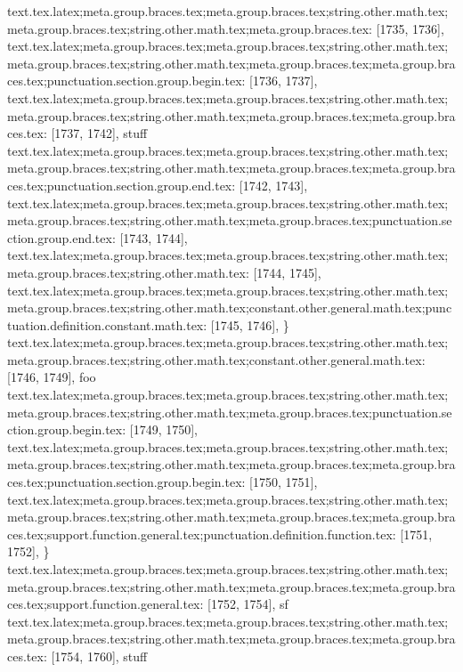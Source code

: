 {{{{{{{{{{{{{{{{{{{{{{{{{{{{{{{{{{{{{{{{{{{{{{text.tex.latex;meta.group.braces.tex;meta.group.braces.tex;string.other.math.tex;meta.group.braces.tex;string.other.math.tex;meta.group.braces.tex: [1735, 1736], { }
text.tex.latex;meta.group.braces.tex;meta.group.braces.tex;string.other.math.tex;meta.group.braces.tex;string.other.math.tex;meta.group.braces.tex;meta.group.braces.tex;punctuation.section.group.begin.tex: [1736, 1737], {{}
text.tex.latex;meta.group.braces.tex;meta.group.braces.tex;string.other.math.tex;meta.group.braces.tex;string.other.math.tex;meta.group.braces.tex;meta.group.braces.tex: [1737, 1742], {stuff}
text.tex.latex;meta.group.braces.tex;meta.group.braces.tex;string.other.math.tex;meta.group.braces.tex;string.other.math.tex;meta.group.braces.tex;meta.group.braces.tex;punctuation.section.group.end.tex: [1742, 1743], {}}
text.tex.latex;meta.group.braces.tex;meta.group.braces.tex;string.other.math.tex;meta.group.braces.tex;string.other.math.tex;meta.group.braces.tex;punctuation.section.group.end.tex: [1743, 1744], {}}
text.tex.latex;meta.group.braces.tex;meta.group.braces.tex;string.other.math.tex;meta.group.braces.tex;string.other.math.tex: [1744, 1745], {
}
text.tex.latex;meta.group.braces.tex;meta.group.braces.tex;string.other.math.tex;meta.group.braces.tex;string.other.math.tex;constant.other.general.math.tex;punctuation.definition.constant.math.tex: [1745, 1746], {\}
text.tex.latex;meta.group.braces.tex;meta.group.braces.tex;string.other.math.tex;meta.group.braces.tex;string.other.math.tex;constant.other.general.math.tex: [1746, 1749], {foo}
text.tex.latex;meta.group.braces.tex;meta.group.braces.tex;string.other.math.tex;meta.group.braces.tex;string.other.math.tex;meta.group.braces.tex;punctuation.section.group.begin.tex: [1749, 1750], {{}
text.tex.latex;meta.group.braces.tex;meta.group.braces.tex;string.other.math.tex;meta.group.braces.tex;string.other.math.tex;meta.group.braces.tex;meta.group.braces.tex;punctuation.section.group.begin.tex: [1750, 1751], {{}
text.tex.latex;meta.group.braces.tex;meta.group.braces.tex;string.other.math.tex;meta.group.braces.tex;string.other.math.tex;meta.group.braces.tex;meta.group.braces.tex;support.function.general.tex;punctuation.definition.function.tex: [1751, 1752], {\}
text.tex.latex;meta.group.braces.tex;meta.group.braces.tex;string.other.math.tex;meta.group.braces.tex;string.other.math.tex;meta.group.braces.tex;meta.group.braces.tex;support.function.general.tex: [1752, 1754], {sf}
text.tex.latex;meta.group.braces.tex;meta.group.braces.tex;string.other.math.tex;meta.group.braces.tex;string.other.math.tex;meta.group.braces.tex;meta.group.braces.tex: [1754, 1760], { stuff}
}}}}}}}}}}}}}}}}}}}}}}}}}}}}}}}}}}}}}}}}}}}}}}}}}

